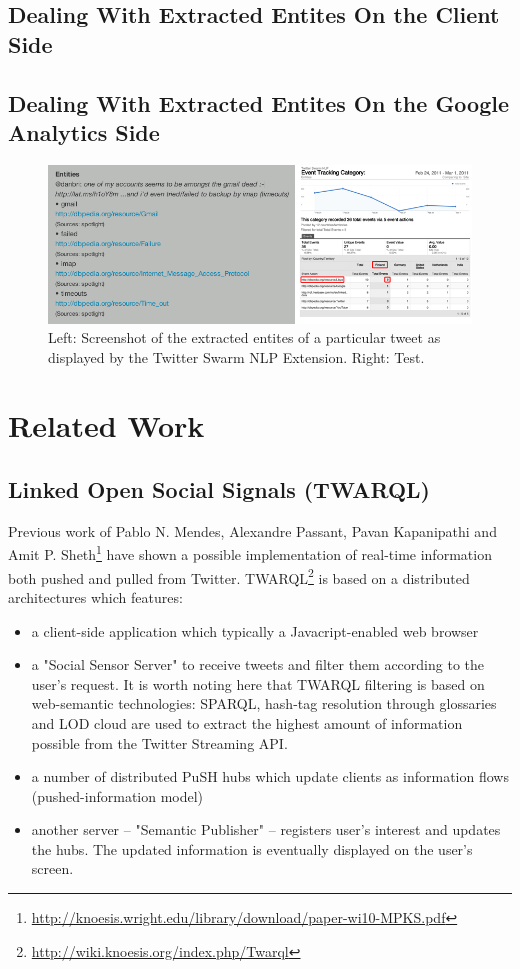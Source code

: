 \documentclass[runningheads,a4paper]{llncs}
\begin{document}
\subsection{Dealing With Extracted Entites On the Client Side}
\subsection{Dealing With Extracted Entites On the Google Analytics Side}

\begin{figure}[h!]
  \centering
  \includegraphics[width=0.95\linewidth]{combined.png}
  \caption{Left: Screenshot of the extracted entites of a particular tweet as displayed by the Twitter Swarm NLP Extension. Right: Test.}
  \label{fig:dataflow}
\end{figure}

\section{Related Work}

\subsection{Linked Open Social Signals (TWARQL)}
Previous work of Pablo N. Mendes, Alexandre Passant, Pavan Kapanipathi and Amit P. Sheth\footnote{\url{http://knoesis.wright.edu/library/download/paper-wi10-MPKS.pdf}} have shown a possible implementation of real-time information both pushed and pulled from Twitter.
TWARQL\footnote{\url{http://wiki.knoesis.org/index.php/Twarql}} is based on a distributed architectures which features: 
\begin{itemize}
\item a client-side application which typically a Javacript-enabled web browser
\item a "Social Sensor Server" to receive tweets and filter them according to the user's request. It is worth noting here that TWARQL filtering is based on web-semantic technologies: SPARQL, hash-tag resolution through glossaries and LOD cloud are used to extract the highest amount of information possible from the Twitter Streaming API.
\item a number of distributed PuSH hubs which update clients as information flows (pushed-information model)
\item another server -- "Semantic Publisher" -- registers user's interest and updates the hubs. The updated information is eventually displayed on the user's screen.
\end{itemize}
\end{document}
